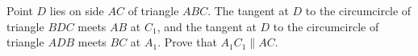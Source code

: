 Point $D$ lies on side $AC$ of triangle $ABC$. The tangent at $D$ to the circumcircle of triangle $BDC$ meets $AB$ at $C_1$, and the tangent at $D$ to the circumcircle of triangle $ADB$ meets $BC$ at $A_1$. Prove that $A_1C_1\parallel AC$.
